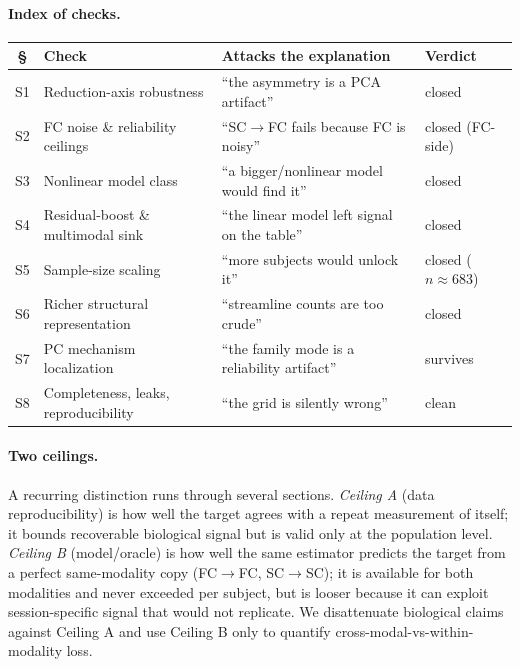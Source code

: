 \documentclass{article}
\newcommand{\scfc}{SC$\rightarrow$FC}
\begin{document}
\paragraph{Index of checks.}
\begin{table}[h]
\centering\small
\begin{tabular}{@{}cl l l@{}}
\toprule
\textbf{\S} & \textbf{Check} & \textbf{Attacks the explanation} & \textbf{Verdict} \\
\midrule
S1 & Reduction-axis robustness & ``the asymmetry is a PCA artifact'' & closed \\
S2 & FC noise \& reliability ceilings & ``\scfc{} fails because FC is noisy'' & closed (FC-side) \\
S3 & Nonlinear model class & ``a bigger/nonlinear model would find it'' & closed \\
S4 & Residual-boost \& multimodal sink & ``the linear model left signal on the table'' & closed \\
S5 & Sample-size scaling & ``more subjects would unlock it'' & closed ($n\!\approx\!683$) \\
S6 & Richer structural representation & ``streamline counts are too crude'' & closed \\
S7 & PC mechanism localization & ``the family mode is a reliability artifact'' & survives \\
S8 & Completeness, leaks, reproducibility & ``the grid is silently wrong'' & clean \\
\bottomrule
\end{tabular}
\end{table}

\paragraph{Two ceilings.} A recurring distinction runs through several sections.
\emph{Ceiling A} (data reproducibility) is how well the target agrees with a repeat
measurement of itself; it bounds recoverable biological signal but is valid only at the
population level. \emph{Ceiling B} (model/oracle) is how well the same estimator predicts the
target from a perfect same-modality copy (\mbox{FC$\rightarrow$FC}, \mbox{SC$\rightarrow$SC});
it is available for both modalities and never exceeded per subject, but is looser because it
can exploit session-specific signal that would not replicate. We disattenuate biological
claims against Ceiling A and use Ceiling B only to quantify cross-modal-vs-within-modality loss.
\end{document}
